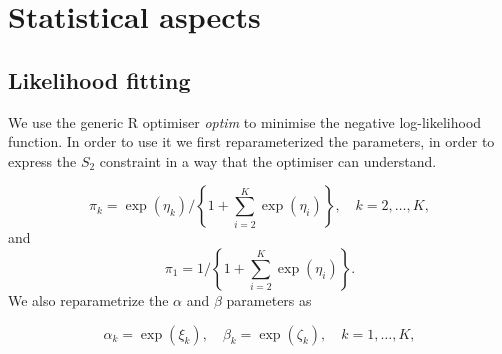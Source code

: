 \chapter{Statistical aspects}
\label{sec:stats}
\section{Likelihood fitting}

We use the generic R optimiser \textit{optim} to minimise the negative log-likelihood function. In order to use it we first reparameterized the parameters, in order to express the $S_2$ constraint in a way that the optimiser can understand.

$$
\pi_k = \exp(\eta_k)/\left\{ 1+ \sum_{i=2}^K\exp(\eta_i)\right\}, \quad k=2,\ldots, K, 
$$
and 
$$
\pi_1 = 1/\left\{ 1+ \sum_{i=2}^K\exp(\eta_i)\right\}.
$$
We also reparametrize the $\alpha$ and $\beta$ parameters as

$$
\alpha_k = \exp(\xi_k), \quad \beta_k = \exp(\zeta_k), \quad k=1,\ldots,K,
$$

